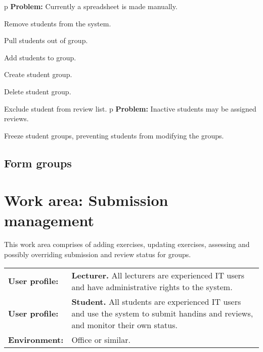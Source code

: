 \documentclass[Main]{subfiles}
\begin{document}
\begin{TaskTable}
\RecordAddi
{p}
{\textbf{Problem:} Currently a spreadsheet is made manually.}{}{}

\Record
{Remove students from the system.}{}{}

\Record
{Pull students out of group.}{}{}

\Record
{Add students to group.}{}{}

\Record
{Create student group.}{}{}

\Record
{Delete student group.}{}{}

\Record
{Exclude student from review list.}{}{}
\RecordAddi
{p}
{\textbf{Problem:} Inactive students may be assigned reviews.}{}{}

\Record
{Freeze student groups, preventing students from modifying the groups.}{}{}
\end{TaskTable}





\subsection{Form groups} \label{sec:FormGroups}

\begin{DataIntro}
\end{DataIntro}

\begin{TaskTable}
\end{TaskTable}






\newpage

\section{Work area: Submission management}
This work area comprises of adding exercises, updating exercises, assessing and possibly overriding submission and review status for groups.

\begin{tabular}{l  p{13cm}}
 \textbf{User profile:} & \textbf{Lecturer.} All lecturers are experienced IT users and have administrative rights to the system. \\
 \textbf{User profile:} & \textbf{Student.} All students are experienced IT users and use the system to submit handins and reviews, and monitor their own status.  \\
 \textbf{Environment:} & Office or similar.
\end{tabular}
\end{document}
